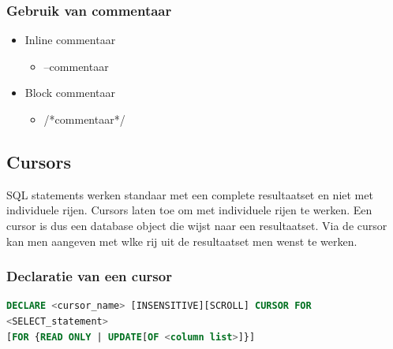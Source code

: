 \documentclass[a4paper,12pt]{article}
\begin{document}
\subsubsection{Gebruik van commentaar}
\begin{itemize}
\item Inline commentaar
	\begin{itemize}
	\item --commentaar
	\end{itemize}
\item Block commentaar
	\begin{itemize}
	\item /*commentaar*/
	\end{itemize}
\end{itemize}

\subsection{Cursors}
SQL statements werken standaar met een complete resultaatset en niet met individuele rijen. Cursors laten toe om met individuele rijen te werken.
Een cursor is dus een database object die wijst naar een resultaatset. Via de cursor kan men aangeven met wlke rij uit de resultaatset men wenst te werken.

\subsubsection{Declaratie van een cursor}
\begin{lstlisting}[language=sql, breaklines=true]
DECLARE <cursor_name> [INSENSITIVE][SCROLL] CURSOR FOR
<SELECT_statement>
[FOR {READ ONLY | UPDATE[OF <column list>]}]
\end{lstlisting}
\end{document}
